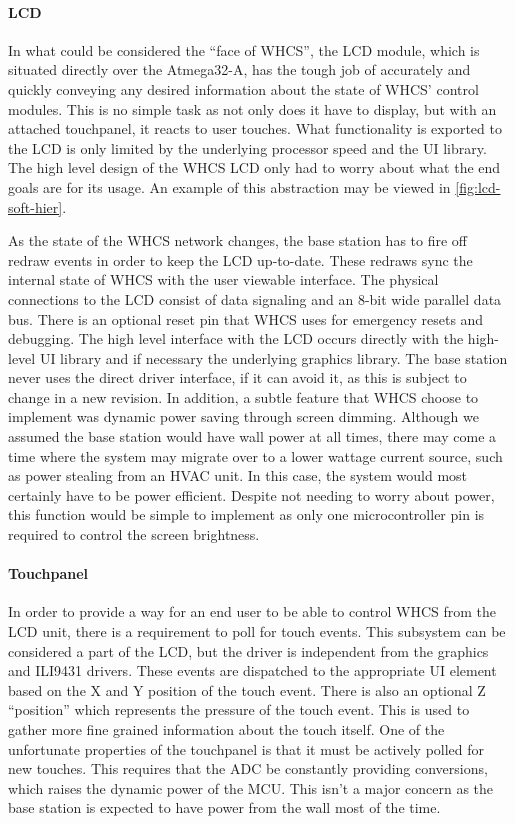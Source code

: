 \paragraph{LCD}
In what could be considered the ``face of WHCS'', the LCD module, which is
situated directly over the Atmega32-A, has the tough job of accurately
and quickly conveying any desired information about the state of WHCS' control
modules. This is no simple task as not only does it have to display, but with
an attached touchpanel, it reacts to user touches. What functionality is
exported to the LCD is only limited by the underlying processor speed and the
UI library. The high level design of the WHCS LCD only had to worry about
what the end goals are for its usage. An example of this abstraction may be
viewed in \autoref{fig:lcd-soft-hier}.


As the state of the WHCS network changes, the base station has to fire
off redraw events in order to keep the LCD up-to-date. These redraws sync
the internal state of WHCS with the user viewable interface. The physical
connections to the LCD consist of data signaling and an 8-bit wide
parallel data bus. There is an optional reset pin that WHCS uses for
emergency resets and debugging. The high level interface with the LCD
occurs directly with the high-level UI library and if necessary the underlying
graphics library. The base station never uses the direct driver interface, if it can avoid it,
as this is subject to change in a new revision. 
In addition, a subtle feature that WHCS choose to implement was
dynamic power saving through screen dimming. Although we assumed the base
station would have wall power at all times, there may come a time where the
system may migrate over to a lower wattage current source, such as power
stealing from an HVAC unit. In this case, the system would most certainly have
to be power efficient. Despite not needing to worry about power, this function
would be simple to implement as only one microcontroller pin is required to
control the screen brightness.

\paragraph{Touchpanel}
In order to provide a way for an end user to be able to control WHCS from the
LCD unit, there is a requirement to poll for touch events.
This subsystem can be considered a part of the LCD, but the driver is independent
from the graphics and ILI9431 drivers. These events are dispatched
to the appropriate UI element  based on the X and Y position of the touch
event. There is also an optional Z ``position'' which represents the pressure
of the touch event. This is used to gather more fine grained information
about the touch itself. One of the unfortunate properties of the touchpanel is
that it must be actively polled for new touches. This requires that the ADC be
constantly providing conversions, which raises the dynamic power of the MCU.
This isn't a major concern as the base station is expected to have power from the wall
most of the time.

